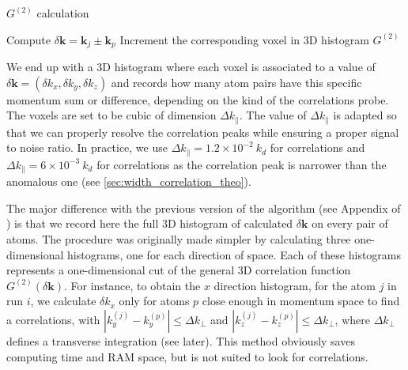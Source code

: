 

\begin{algorithm}[h!]
 \caption{$G^{(2)}$ calculation}
    \begin{algorithmic}
                    \State Compute $\delta \bm{k} = \bm{k}_j \pm \bm{k}_p$
                    \State Increment the corresponding voxel in 3D histogram $G^{(2)}$ 
                \EndFor
            \EndFor
        \EndFor
\end{algorithmic}

\end{algorithm}

\noindent We end up with a 3D histogram where each voxel is associated to a value of $\delta \bm{k} = (\delta k_x,\delta k_y, \delta k_z)$ and records how many atom pairs have this specific momentum sum or difference, depending on the kind of the correlations probe. The voxels are set to be cubic of dimension $\Delta k_{\parallel}$. The value of $\Delta k_{\parallel}$ is adapted so that we can properly resolve the correlation peaks while ensuring a proper signal to noise ratio. In practice, we use $\Delta k_{\parallel}= 1.2 \times 10^{-2} \ k_d$ for \kmk correlations and $\Delta k_{\parallel}= 6 \times 10^{-3} \ k_d$ for \kk correlations as the correlation peak is narrower than the anomalous one (see \ref{sec:width_correlation_theo}).

The major difference with the previous version of the algorithm (see Appendix of \cite{carcy2019momentum}) is that we record here the full 3D histogram of calculated $\delta \bm{k}$ on every pair of atoms. The procedure was originally made simpler by calculating three one-dimensional histograms, one for each direction of space. Each of these histograms represents a one-dimensional cut of the general 3D correlation function $G^{(2)}(\delta \bm{k})$. For instance, to obtain the $x$ direction histogram, for the atom $j$ in run $i$, we calculate $\delta k_x$ only for atoms $p$ close enough in momentum space to find a \kk correlations, \ie with $|k_y^{(j)}-k_y^{(p)}| \leq \Delta k_{\perp}$ and $|k_z^{(j)}-k_z^{(p)}| \leq \Delta k_{\perp}$, where $\Delta k_{\perp}$ defines a transverse integration (see later). This method obviously saves computing time and RAM space, but is not suited to look for \kmk correlations.

